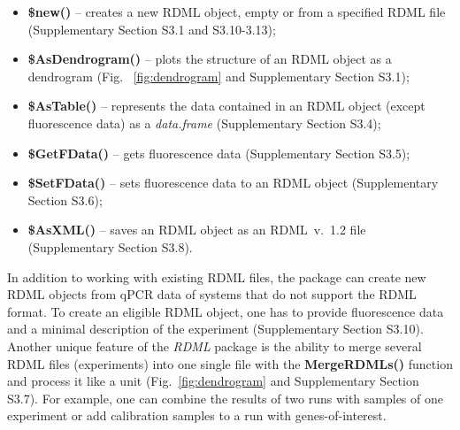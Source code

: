 \documentclass{bioinfo}
\begin{document}
\begin{itemize} 
\item \textbf{\$new()} -- creates a new RDML object, empty or from a specified RDML 
file (Supplementary Section S3.1 and S3.10-3.13);
\item \textbf{\$AsDendrogram()} -- plots the
structure of an RDML object as a dendrogram (Fig.~ \ref{fig:dendrogram} and Supplementary Section 
S3.1);
\item \textbf{\$AsTable()} -- represents the data contained in an RDML object (except 
fluorescence data) as a \textit{data.frame} (Supplementary Section S3.4);
\item \textbf{\$GetFData()} -- gets fluorescence data (Supplementary Section S3.5);
\item \textbf{\$SetFData()} -- sets fluorescence data to an RDML object (Supplementary Section S3.6); 
\item \textbf{\$AsXML()} – saves an RDML object as an RDML~v.~1.2 file (Supplementary Section S3.8).
\end{itemize}
In addition to working with existing RDML files, the package can create new RDML 
objects from qPCR data of systems that do not support the RDML format. To 
create an eligible RDML object, one has to provide fluorescence data and a minimal 
description of the experiment (Supplementary Section S3.10). Another unique feature of the \textit{RDML} 
package is the ability to merge several RDML files (experiments) into one single file with the 
\textbf{MergeRDMLs()} function and process it like a unit (Fig.~\ref{fig:dendrogram} and Supplementary Section 
S3.7). For example, one can combine the results of two runs with samples of one 
experiment or add calibration samples to a run with genes-of-interest.
\end{document}
